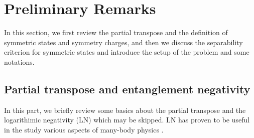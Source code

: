 \documentclass[aps,pra,reprint,superscriptaddress,twocolumn,notitlepage]{revtex4-1}
\numberwithin{equation}{section}
\begin{document}
\section{Preliminary Remarks}
\label{sec:Preliminary}

In this section, we first review the partial transpose and the definition of symmetric states and symmetry charges, and then we discuss the separability criterion for symmetric states and introduce the setup of the problem and some notations.

\subsection{Partial transpose and entanglement negativity}

In this part, we briefly review some basics about the partial transpose and the logarithimic negativity (LN) which may be skipped.
LN has proven to be useful in the study various aspects of many-body physics \cite{PhysRevA.66.042327,PhysRevLett.100.080502,PhysRevA.78.012335,Anders2008,PhysRevA.77.062102,PhysRevA.80.012325,Eisler_Neq,Sherman2016,dct-16,PhysRevA.80.010304,PhysRevLett.105.187204,PhysRevB.81.064429,PhysRevLett.109.066403,Ruggiero_1,PhysRevA.81.032311,PhysRevA.84.062307,Mbeng,Gray2019,Grover2018,java-2018,Calabrese2012,Calabrese2013,Calabrese_Ft2015,Ruggiero_2,Alba_spectrum,kpp-14,fournier-2015,bc-16,Wald_2020,PhysRevB.101.064207,lu2019structure,angelramelli2020logarithmic,Juh_sz_2018,Schreiber,rosz2020entanglement,Shapourian_FS,wu2019entanglement,10.21468/SciPostPhys.8.4.063,Wen2016_1,Wen2016_2,PhysRevA.88.042319,PhysRevA.88.042318,hc-18,YeJePark,PhysRevB.101.085136,Clabrese_network2013,Alba2013,PhysRevB.90.064401,Nobili2015,Rangamani2014,2014JHEP...09..010K,PhysRevD.99.106014,PhysRevLett.123.131603,ctc-14,ez-14,hb-15,ac-18b,wen-2015,gh-18,alba2020spreading,Gruber_2020,PhysRevB.101.245130,Kudler-Flam2019,2020JHEP...04..074K,2020arXiv200811266K,Pollmann_Turner2012,Shiozaki_Ryu2017,Shap_unoriented,Shiozaki_antiunitary,Kobayashi,Grover2020}.
 
\end{document}
